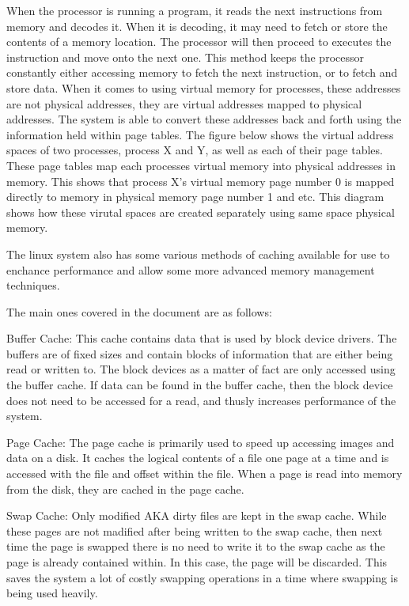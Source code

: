 \documentclass[10pt,draftclsnofoot,onecolumn]{IEEEtran}
\begin{document}
When the processor is running a program, it reads the next instructions from
memory and decodes it. When it is decoding, it may need to fetch or store the
contents of a memory location. The processor will then proceed to executes the
instruction and move onto the next one. This method keeps the processor constantly
either accessing memory to fetch the next instruction, or to fetch and store
data. When it comes to using virtual memory for processes, these addresses are
not physical addresses, they are virtual addresses mapped to physical addresses.
The system is able to convert these addresses back and forth using the information
held within page tables. The figure below shows the virtual address spaces of
two processes, process X and  Y, as well as each of their page tables. These page
tables map each processes virtual memory into physical addresses in memory. This
shows that process X's virtual memory page number 0 is mapped directly to memory
in physical memory page number 1 and etc. This diagram shows how these virutal
spaces are created separately using same space physical memory.

The linux system also has some various methods of caching available for use to
enchance performance and allow some more advanced memory management techniques.

The main ones covered in the document are as follows:

Buffer Cache: This cache contains data that is used by block device drivers. The
buffers are of fixed sizes and contain blocks of information that are either
being read or written to. The block devices as a matter of fact are only accessed
using the buffer cache. If data can be found in the buffer cache, then the block
device does not need to be accessed for a read, and thusly increases performance
of the system.

Page Cache: The page cache is primarily used to speed up accessing images and
data on a disk. It caches the logical contents of a file one page at a time and
is accessed with the file and offset within the file. When a page is read into
memory from the disk, they are cached in the page cache.

Swap Cache: Only modified AKA dirty files are kept in the swap cache. While
these pages are not madified after being written to the swap cache, then next
time the page is swapped there is no need to write it to the swap cache as the
page is already contained within. In this case, the page will be discarded. This
saves the system a lot of costly swapping operations in a time where swapping is
being used heavily.
\end{document}
